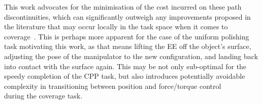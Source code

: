 \documentclass[journal]{IEEEtran}
\begin{document}
This work advocates for the minimisation of the cost incurred on these path discontinuities, which can significantly 
outweigh any improvements proposed in the literature that may occur locally in the task space when it comes 
to coverage~\cite{hassan2018a}. This is perhaps more apparent for the case of the uniform polishing task motivating this work, 
as that means lifting the EE off the object's surface, adjusting the pose of the manipulator to the new configuration, and landing back into contact with the surface again.
This may be not only sub-optimal for the speedy completion of the CPP task, but also introduces potentially avoidable complexity in transitioning between position and force/torque control~\cite{cheah2003brief}~\cite{heck2015switched}~\cite{mirrazavi2018a}~\cite{solanes2018adaptive}~\cite{solanes2019robust} %
during the coverage task. 
 
\end{document}
